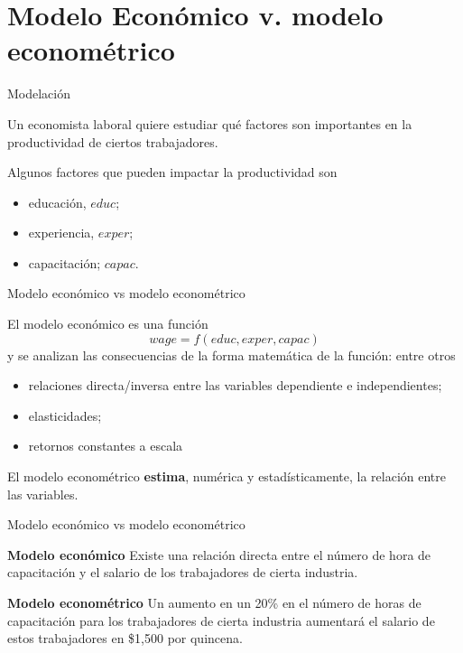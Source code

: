 \documentclass[11pt,handout]{beamer}
\begin{document}
\section{Modelo Económico v. modelo econométrico}

\begin{frame}{Modelación}

Un economista laboral quiere estudiar qu\'e factores son importantes en la productividad de ciertos trabajadores.

\vspace{.5cm}
Algunos factores que pueden impactar la productividad son

\begin{itemize}[<+->]
	\item educaci\'on, $educ$;
	\item experiencia, $exper$; 
	\item capacitaci\'on; $capac$.
\end{itemize}

\end{frame}

\begin{frame}{Modelo econ\'omico vs  modelo econométrico}

El \alert{modelo económico} es una función
\[
	wage = f(educ, exper, capac)
\]
y  se analizan las consecuencias de la forma matemática de la función: entre otros
\begin{itemize}
	\item relaciones directa/inversa entre las variables dependiente e independientes;
	
	\item elasticidades;
	
	\item retornos constantes a escala
\end{itemize}

\vspace{.25cm}
El \alert{modelo econométrico} \textbf{estima}, numérica y estadísticamente, la relación entre las variables.

\end{frame}

\begin{frame}{Modelo econ\'omico vs  modelo econométrico}

\pause 
\textbf{Modelo económico} Existe una relación directa entre el número de hora de capacitación y el salario de los trabajadores de cierta industria.

\pause  \vspace{.25cm}
\textbf{Modelo econométrico} Un aumento en un 20\% en el número de horas de capacitación para los trabajadores de cierta industria aumentará el salario de estos trabajadores en \$1,500 por quincena. 

 \end{frame}
\end{document}
